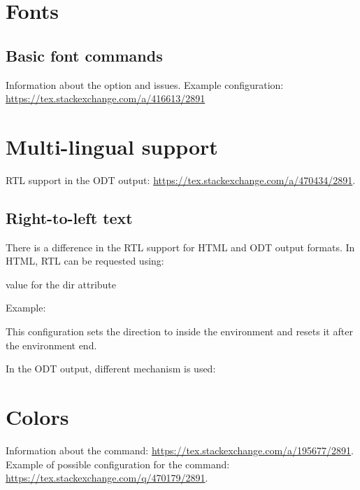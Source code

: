 \documentclass{book}
\begin{document}
\section{Fonts}
\subsection{Basic font commands}

Information about the  option and  issues. 
Example configuration:
\url{https://tex.stackexchange.com/a/416613/2891}

\section{Multi-lingual support}

RTL support in the ODT output: \url{https://tex.stackexchange.com/a/470434/2891}.

\subsection{Right-to-left text}

There is a difference in the RTL support for HTML and ODT output formats. In HTML, RTL can be requested using:

 { value for the dir attribute}\EndDoc

Example:

\begin{texsource}
\end{texsource}

This configuration sets the direction to  inside the  environment and resets it after the environment end.

In the ODT output, different mechanism is used:

\begin{texsource}
\end{texsource}

\section{Colors}

Information about the \texcommand{\color} command:
\url{https://tex.stackexchange.com/a/195677/2891}.
Example of possible configuration for the \texcommand{\color} command: 
\url{https://tex.stackexchange.com/q/470179/2891}.
\end{document}
